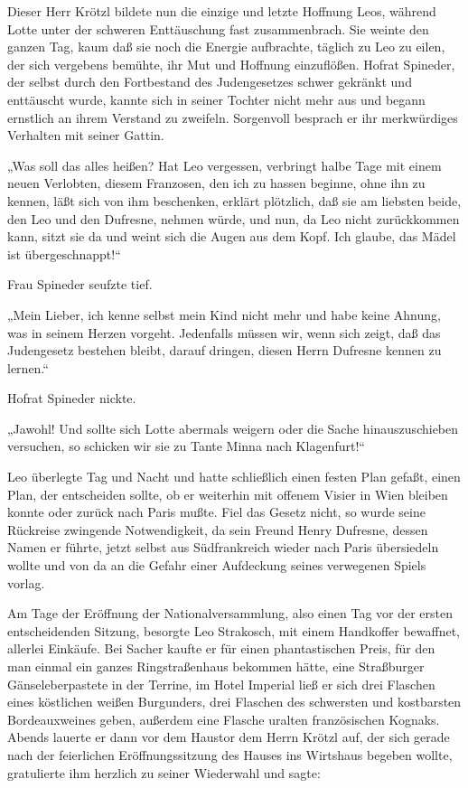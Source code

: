 Dieser Herr Krötzl bildete nun die einzige und letzte Hoffnung
Leos, während Lotte unter der schweren Enttäuschung  fast zusammenbrach. Sie weinte den ganzen Tag, kaum daß sie noch
die Energie aufbrachte, täglich zu Leo zu eilen, der sich vergebens
bemühte, ihr Mut und Hoffnung einzuflößen. Hofrat Spineder, der
selbst durch den Fortbestand des Judengesetzes schwer gekränkt und
enttäuscht wurde, kannte sich in seiner Tochter nicht mehr aus und
begann ernstlich an ihrem Verstand zu zweifeln. Sorgenvoll besprach
er ihr merkwürdiges Verhalten mit seiner Gattin.

„Was soll das alles heißen? Hat Leo vergessen, verbringt halbe Tage
mit einem neuen Verlobten, diesem Franzosen, den ich zu hassen
beginne, ohne ihn zu kennen, läßt sich von ihm beschenken, erklärt
plötzlich, daß sie am liebsten beide, den Leo und den Dufresne,
nehmen würde, und nun, da Leo nicht zurückkommen kann, sitzt sie da
und weint sich die Augen aus dem Kopf. Ich glaube, das Mädel ist
übergeschnappt!“

Frau Spineder seufzte tief.

„Mein Lieber, ich kenne selbst mein Kind nicht mehr und habe keine
Ahnung, was in seinem Herzen vorgeht. Jedenfalls müssen wir, wenn
sich zeigt, daß das Judengesetz bestehen bleibt, darauf dringen,
diesen Herrn Dufresne kennen zu lernen.“

Hofrat Spineder nickte.

„Jawohl! Und sollte sich Lotte abermals weigern oder die Sache
hinauszuschieben versuchen, so schicken wir sie zu Tante Minna nach
Klagenfurt!“

Leo überlegte Tag und Nacht und hatte schließlich einen festen Plan
gefaßt, einen Plan, der entscheiden sollte, ob er 
weiterhin mit offenem Visier in Wien bleiben konnte oder zurück
nach Paris mußte. Fiel das Gesetz nicht, so wurde seine Rückreise
zwingende Notwendigkeit, da sein Freund Henry Dufresne, dessen
Namen er führte, jetzt selbst aus Südfrankreich wieder nach Paris
übersiedeln wollte und von da an die Gefahr einer Aufdeckung seines
verwegenen Spiels vorlag.

\tb{* * *}
Am Tage der Eröffnung der Nationalversammlung, also einen Tag vor
der ersten entscheidenden Sitzung, besorgte Leo Strakosch, mit
einem Handkoffer bewaffnet, allerlei Einkäufe. Bei Sacher kaufte er
für einen phantastischen Preis, für den man einmal ein ganzes
Ringstraßenhaus bekommen hätte, eine Straßburger Gänseleberpastete
in der Terrine, im Hotel Imperial ließ er sich drei Flaschen eines
köstlichen weißen Burgunders, drei Flaschen des schwersten und
kostbarsten Bordeauxweines geben, außerdem eine Flasche uralten
französischen Kognaks. Abends lauerte er dann vor dem Haustor dem
Herrn Krötzl auf, der sich gerade nach der feierlichen
Eröffnungssitzung des Hauses ins Wirtshaus begeben wollte,
gratulierte ihm herzlich zu seiner Wiederwahl und sagte:

